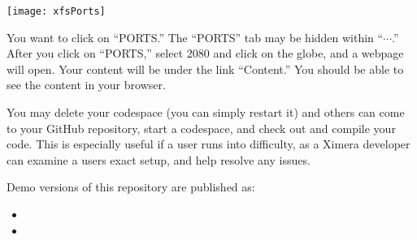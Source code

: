 \documentclass{ximera}
\begin{document}
\newpage
 
\begin{image}
    \texttt{[image: xfsPorts]}
\end{image}
You want
to click on ``PORTS.'' The ``PORTS'' tab may be hidden within ``$\cdots$.''
After you click on ``PORTS,'' select 2080 and click on the globe, and a webpage will open. Your
content will be under the link ``Content.'' You should be able to see the
content in your browser.


You may delete your codespace (you can simply restart it) and others can come to your GitHub repository, start a codespace, and check out and compile your code. 
This is especially useful if a user runs into difficulty, as a Ximera developer can examine a users exact setup, and help resolve any issues. 


Demo versions of this repository are published as:
\begin{itemize}
    \item {}
    \item {}
\end{itemize}

\pdfOnly{\end{multicols}}
\pdfOnly{\twocolumn}
\end{document}
